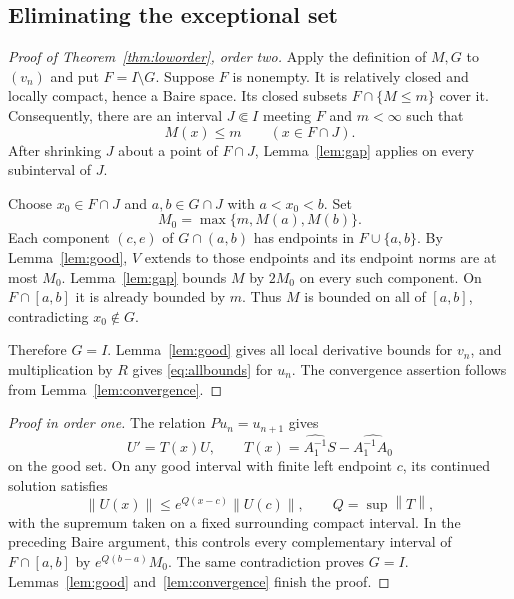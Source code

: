 \documentclass[11pt,reqno]{amsart}
\numberwithin{equation}{section}
\theoremstyle{definition}
\theoremstyle{remark}
\newcommand{\norm}[1]{\left\lVert #1\right\rVert}
\begin{document}
\subsection{Eliminating the exceptional set}
\begin{proof}[Proof of Theorem~\ref{thm:loworder}, order two]
Apply the definition of $M,G$ to $(v_n)$ and put $F=I\setminus G$. Suppose $F$ is nonempty. It is relatively closed and locally compact, hence a Baire space. Its closed subsets $F\cap\{M\le m\}$ cover it. Consequently, there are an interval $J\Subset I$ meeting $F$ and $m<\infty$ such that
\[
 M(x)\le m\qquad(x\in F\cap J).
\]
After shrinking $J$ about a point of $F\cap J$, Lemma~\ref{lem:gap} applies on every subinterval of $J$.

Choose $x_0\in F\cap J$ and $a,b\in G\cap J$ with $a<x_0<b$. Set
\[
 M_0=\max\{m,M(a),M(b)\}.
\]
Each component $(c,e)$ of $G\cap(a,b)$ has endpoints in $F\cup\{a,b\}$. By Lemma~\ref{lem:good}, $V$ extends to those endpoints and its endpoint norms are at most $M_0$. Lemma~\ref{lem:gap} bounds $M$ by $2M_0$ on every such component. On $F\cap[a,b]$ it is already bounded by $m$. Thus $M$ is bounded on all of $[a,b]$, contradicting $x_0\notin G$.

Therefore $G=I$. Lemma~\ref{lem:good} gives all local derivative bounds for $v_n$, and multiplication by $R$ gives \eqref{eq:allbounds} for $u_n$. The convergence assertion follows from Lemma~\ref{lem:convergence}.
\end{proof}

\begin{proof}[Proof in order one]
The relation $Pu_n=u_{n+1}$ gives
\[
 U'=T(x)U,\qquad
 T(x)=\widehat{A_1^{-1}}S-\widehat{A_1^{-1}A_0}
\]
on the good set. On any good interval with finite left endpoint $c$, its continued solution satisfies
\[
 \norm{U(x)}\le e^{Q(x-c)}\norm{U(c)},\qquad
 Q=\sup\norm{T\!},
\]
with the supremum taken on a fixed surrounding compact interval. In the preceding Baire argument, this controls every complementary interval of $F\cap[a,b]$ by $e^{Q(b-a)}M_0$. The same contradiction proves $G=I$. Lemmas~\ref{lem:good} and~\ref{lem:convergence} finish the proof.
\end{proof}
\end{document}
